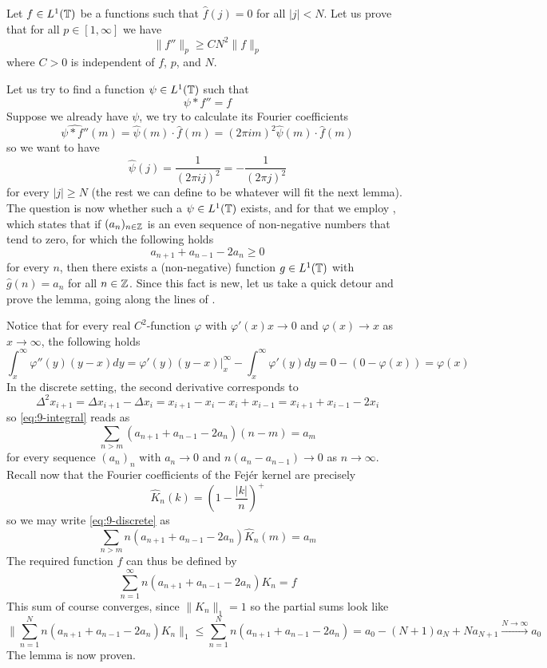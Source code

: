 \documentclass[a4paper, 12pt]{article}
\begin{document}
\begin{Exercise}
    Let $f \in L^1(\mathbb{T})$ be a functions such that $\hat{f}(j) = 0$ for all $|j| < N$.
    Let us prove that for all $p \in [1, \infty]$ we have
    \[
        \| f'' \|_p \geq C N^2 \| f \|_p
    \]
    where $C > 0$ is independent of $f$, $p$, and $N$.

    Let us try to find a function $\psi \in L^1(\mathbb{T})$ such that
    \[
        \psi * f'' = f
    \]
    Suppose we already have $\psi$, we try to calculate its Fourier coefficients
    \[
        \widehat{\psi * f''}(m)
        = \hat{\psi}(m) \cdot \hat{f}(m)
        = (2\pi i m)^2 \hat{\psi}(m) \cdot \hat{f}(m)
    \]
    so we want to have
    \[
        \hat{\psi}(j)
        = \frac{1}{(2\pi i j)^2}
        = -\frac{1}{(2\pi j)^2}
    \]
    for every $|j| \geq N$ (the rest we can define to be whatever will fit the
    next lemma). The question is now whether such a $\psi \in L^1(\mathbb{T})$ exists,
    and for that we employ \cite[Vol. I, Lemma 1.12]{Muscalu2013}, which states
    that if $(a_n)_{n \in \mathbb{Z}}$ is an even sequence of non-negative numbers that
    tend to zero, for which the following holds
    \[
        a_{n+1} + a_{n-1} - 2a_n \geq 0
    \]
    for every $n$, then there exists a (non-negative) function $g \in L^1(\mathbb{T})$
    with $\hat{g}(n) = a_n$ for all $n \in \mathbb{Z}$.
    Since this fact is new, let us take a quick detour and prove the lemma,
    going along the lines of \cite{Muscalu2013}.

    Notice that for every real $C^2$-function $\varphi$ with $\varphi'(x)x \to 0$
    and $\varphi(x) \to x$ as $x \to \infty$, the following holds
    \begin{equation}
        \label{eq:9-integral}
        \int_{x}^{\infty} \varphi''(y) (y - x) dy
        = \varphi'(y) (y - x) \Big|_x^\infty - \int_{x}^{\infty} \varphi'(y) dy
        = 0 - (0 - \varphi(x)) = \varphi(x)
    \end{equation}
    In the discrete setting, the second derivative corresponds to
    \[
        \Delta^2 x_{i+1}
        = \Delta x_{i+1} - \Delta x_i
        = x_{i+1} - x_i - x_i + x_{i-1} = x_{i+1} + x_{i-1} - 2x_i
    \]
    so \eqref{eq:9-integral} reads as
    \begin{equation}
        \sum_{n > m} (a_{n+1} + a_{n-1} - 2a_n) (n - m) = a_m
        \label{eq:9-discrete}
    \end{equation}
    for every sequence $(a_n)_n$ with $a_n \to 0$ and $n(a_n - a_{n-1}) \to 0$ as $n \to \infty$.
    Recall now that the Fourier coefficients of the Fej\'er kernel are precisely
    \[
        \hat{K}_n(k) = \left( 1 - \frac{|k|}{n} \right)^+
    \]
    so we may write \eqref{eq:9-discrete} as
    \[
        \sum_{n > m} n (a_{n+1} + a_{n-1} - 2a_n) \hat{K}_n(m) = a_m
    \]
    The required function $f$ can thus be defined by
    \[
        \sum_{n = 1}^{\infty} n (a_{n+1} + a_{n-1} - 2a_n) K_n = f
    \]
    This sum of course converges, since $\|K_n\|_1 = 1$ so the partial sums look like
    \[
        \Big\| \sum_{n = 1}^{N} n (a_{n+1} + a_{n-1} - 2a_n) K_n \Big\|_1
        \leq\sum_{n = 1}^{N} n (a_{n+1} + a_{n-1} - 2a_n)
        = a_0 - (N + 1) a_N + N a_{N+1} \xrightarrow{N \to \infty} a_0
    \]
    The lemma is now proven.


\end{Exercise}
\end{document}
